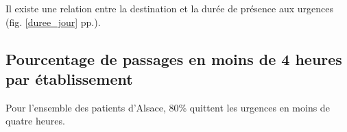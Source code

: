 \documentclass[12pt,english,french,twoside]{book}\usepackage[]{graphicx}\usepackage[]{color}
\begin{document}
Il existe une relation entre la destination et la durée de présence aux urgences (fig. \ref{duree_jour} pp.\pageref{duree_jour}).


\subsection{Pourcentage de passages en moins de 4 heures par établissement}




Pour l'ensemble des patients d'Alsace, 80\% quittent les urgences en moins de quatre heures.

\end{document}

